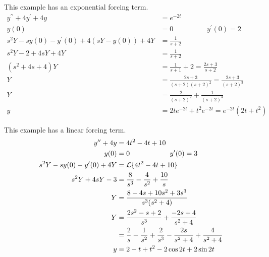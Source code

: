 \documentclass[fleqn,letterpaper]{report}
\begin{document}
\begin{example}
This example has an exponential forcing term.
\begin{align*}
y^{\prime \prime} + 4y^\prime + 4y & = e^{-2t} \\
y(0) & = 0 \hspace{2cm} y^\prime(0) = 2 \\
s^2 Y - sy(0) - y^\prime(0) + 4(sY - y(0)) + 4Y & = \frac{1}{s+2}
\\
s^2 Y - 2 + 4sY + 4Y & = \frac{1}{s+2} \\
(s^2 + 4s + 4)Y & = \frac{1}{s+1} + 2 = \frac{2s+3}{s+2} \\
Y & = \frac{2s+3}{(s+2)(s+2)^2} = \frac{2s+3}{(s+2)^3} \\
Y & = \frac{2}{(s+2)^2} + \frac{1}{(s+2)^3} \\
y & = 2te^{-2t} + t^2e^{-2t} = e^{-2t}(2t+t^2)
\end{align*} 
\end{example}

\begin{example}
This example has a linear forcing term. 
\begin{align*}
y^{\prime \prime} + 4y & = 4t^2 - 4t + 10 \\
y(0) & = 0 \hspace{2cm} y^\prime(0) = 3 \\
s^2 Y - sy(0) - y^\prime(0) + 4Y & = \mathcal{L} \{ 4t^2 - 4t + 10 \}
\\
s^2 Y + 4sY -3 & = \frac{8}{s^3} - \frac{4}{s^2} +
\frac{10}{s}\\
Y & = \frac{8-4s+10s^2 + 3s^3}{s^3(s^2+4)} \\
Y & = \frac{2s^2-s+2}{s^3} + \frac{-2s+4}{s^2+4} \\
& = \frac{2}{s} - \frac{1}{s^2} + \frac{2}{s^3} -
\frac{2s}{s^2+4} + \frac{4}{s^2+4} \\
y & = 2 - t + t^2 - 2 \cos 2t + 2 \sin 2t 
\end{align*} 
\end{example}
\end{document}
